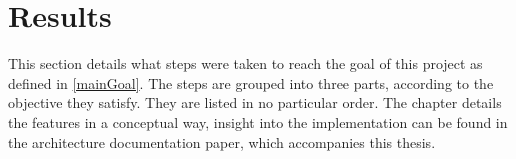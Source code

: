 \section{Results}
This section details what steps were taken to reach the goal of this project as defined in \ref{mainGoal}. The steps are grouped into three parts, according to the objective they satisfy. They are listed in no particular order. The chapter details the features in a conceptual way, insight into the implementation can be found in the architecture documentation paper, which accompanies this thesis. 



